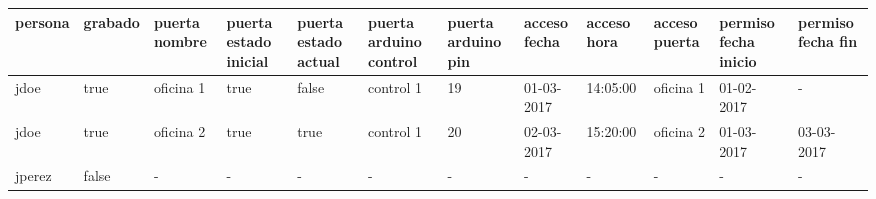 \tiny
\begin{tabular}{|C{0.8cm}|C{0.8cm}|C{0.8cm}|C{0.8cm}|C{0.8cm}|C{0.9cm}|C{0.9cm}|C{1.2cm}|C{0.8cm}|C{0.7cm}|C{1.2cm}|C{1.2cm}|}
  \hline
  persona & grabado & puerta nombre & puerta estado inicial & puerta estado actual & puerta arduino control & puerta arduino pin & acceso fecha & acceso hora & acceso puerta & permiso fecha inicio & permiso fecha fin \\
  \hline
  jdoe & true & oficina 1 & true & false & control 1 & 19 & 01-03-2017 & 14:05:00 & oficina 1 & 01-02-2017 & - \\
  \hline
  jdoe & true & oficina 2 & true & true & control 1 & 20 & 02-03-2017 & 15:20:00 & oficina 2 & 01-03-2017 & 03-03-2017 \\
  \hline
  jperez & false & - & - & - & - & - & - & - & - & - & - \\
  \hline
\end{tabular}